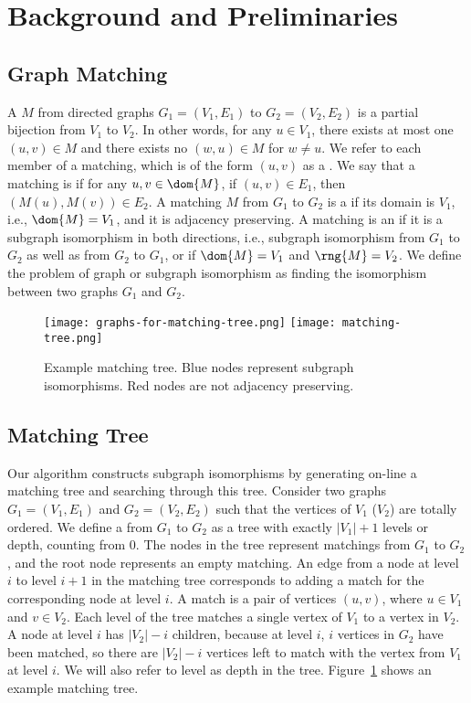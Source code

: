 
%

\section{Background and Preliminaries}

\subsection{Graph Matching}

A  $M$ from directed graphs $G_1 = (V_1, E_1)$ to $G_2 = (V_2, E_2)$ is a
partial bijection from $V_1$ to $V_2$.  
%
In other words, for any $u
\in V_1$, there exists at most one $(u, v) \in M$ and
%
there exists no $(w, u) \in M$ for $w \not= u$.
%
We refer to each member of a matching, which is of the form $(u, v)$ as
a .
%
We say that a matching is  if for any $u,
v \in \dom{M}$, if $(u,v) \in E_1$, then $(M(u), M(v)) \in
E_2$.
%
A matching $M$ from $G_1$ to $G_2$ is a  if
its domain is $V_1$, i.e., $\dom{M} = V_1$,
%
and
%
it is adjacency preserving.
%
A matching is an  if it is a subgraph isomorphism in
both directions, i.e., subgraph isomorphism from $G_1$ to $G_2$ as
well as from $G_2$ to $G_1$, or if $\dom{M} = V_1$ and $\rng{M} = V_2$.
%
We define the problem of graph or subgraph isomorphism
as finding the isomorphism between two graphs $G_1$ and $G_2$.

\begin{figure}
  \centering
  \texttt{[image: graphs-for-matching-tree.png]}
  \texttt{[image: matching-tree.png]}
  \caption{Example matching tree.  Blue nodes represent subgraph
    isomorphisms. Red nodes are not adjacency preserving.}
  \label{fig:matching-tree}
\end{figure}

\subsection{Matching Tree}\label{sec:matching-tree}
Our algorithm constructs subgraph isomorphisms by generating
on-line a matching tree and searching through this tree.
%
Consider two graphs $G_1 = (V_1, E_1)$ and $G_2 = (V_2, E_2)$ such
that the vertices of $V_1$ ($V_2$) are totally ordered.
%
We define a  from $G_1$ to $G_2$ as a tree with
exactly $|V_1| + 1$ levels or depth, counting from 0.
%
The nodes in the tree represent matchings from
$G_1$ to $G_2$, and the root node represents an empty matching.
%
An edge from a node at level $i$ to level $i+1$ in the matching tree
corresponds to adding a match for the corresponding node at level $i$.
%
A match is a pair of vertices $(u, v)$, where $u \in V_1$ and $v \in V_2$.
%
Each level of the tree matches a single vertex of $V_1$ to a vertex in $V_2$.
%
A node at level $i$ has $|V_2|-i$ children, because at level $i$,
$i$ vertices in $G_2$ have been matched, so there are $|V_2| - i$ vertices left to
match with the vertex from $V_1$ at level $i$.
%
We will also refer to level as depth in the tree.
%
Figure~\ref{fig:matching-tree} shows an example matching tree.


